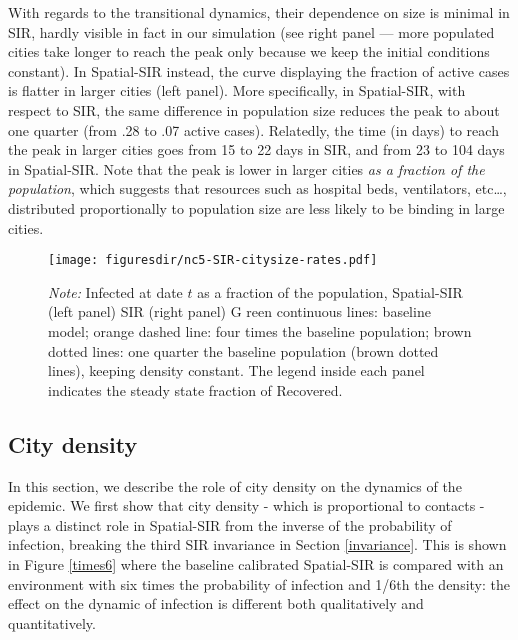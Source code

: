\documentclass[english,11pt]{article}
\newcommand{\notelegendbis}{The legend inside each panel indicates the steady state fraction of Recovered.}
\newcommand{\notemix}[4]{\emph{Note:} Infected at date $t$ as a fraction of the population, #1 #2 #3 #4}
\begin{document}
With regards to the transitional 
dynamics, their dependence on size is minimal in SIR, hardly visible in fact  in our simulation (see right panel --- more populated cities take longer to reach the peak only because we keep the initial conditions constant). In Spatial-SIR instead, the curve displaying the fraction of active
cases is flatter in larger cities (left panel). More specifically, in Spatial-SIR, with respect to SIR, the same difference in population size reduces the peak to about one quarter (from .28  to .07 active cases). Relatedly, the time (in days) to reach the peak in larger cities goes from 15 to 22 days in SIR, and from 23 to 104 days in Spatial-SIR. Note that the peak is lower in larger cities \emph{as a fraction of the population}, which suggests that resources such as hospital beds, ventilators, etc\ldots, distributed proportionally to population size are less likely to be binding in large cities.

\begin{figure}[t]
    \caption{Infection dynamics: population size in Spatial-SIR (left panel) and SIR (right panel)}\label{fig:SIR-City-size-comparisons}
    
    \centering{}%
        \texttt{[image: figuresdir/nc5-SIR-citysize-rates.pdf]}

    \caption*{\normalfont \footnotesize 
    \notemix{Spatial-SIR (left panel)}{SIR (right panel)} Green continuous lines: baseline model; orange dashed line: four times the baseline population; brown dotted lines: one quarter the baseline population (brown dotted lines), keeping density constant. \notelegendbis}
\end{figure}


\subsection{City density} 

In this section, we describe the role of city density on the dynamics of the epidemic. We first show that  city density - which is proportional to contacts - 
plays a distinct role in 
Spatial-SIR from the inverse of the probability of infection, breaking the third SIR  invariance in Section \ref{invariance}.
This is shown in Figure \ref{times6} where the baseline calibrated Spatial-SIR is compared with an environment with six times the probability of infection and 1/6th the density: the effect on the dynamic of 
infection is different both qualitatively and
quantitatively. 
\end{document}
